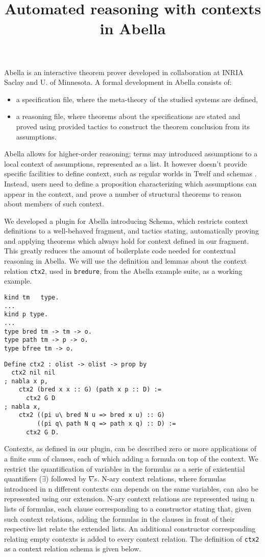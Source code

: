 \documentclass[nocopyrightspace,authoryear]{sigplanconf}
\title{Automated reasoning with contexts in Abella}
\begin{document}
\maketitle
Abella \cite{abellasys} is an interactive theorem prover developed in collaboration at INRIA Saclay and U. of Minnesota. A formal development in Abella consists of:
\begin{itemize}
\item a specification file, where the meta-theory of the studied systems are defined,
\item a reasoning file, where theorems about the specifications are stated and proved using provided tactics to construct the theorem conclusion from its assumptions.
\end{itemize}

Abella allows for higher-order reasoning; terms may introduced assumptions to a local context of assumptions, represented as a list. It however doesn't provide specific facilities to define context, such as regular worlds in Twelf \cite{twelfsys} and schemas \cite{belugasys}. Instead, users need to define a proposition characterizing which assumptions can appear in the context, and prove a number of structural theorems to reason about members of such context.


We developed a plugin for Abella introducing Schema, which restricts context definitions to a well-behaved fragment, and tactics stating, automatically proving and applying theorems which always hold for context defined in our fragment. This greatly reduces the amount of boilerplate code needed for contextual reasoning in Abella. We will use the definition and lemmas about the context relation \lstinline|ctx2|, used in \lstinline|bredure|, from the Abella example suite,  as a working example.
\begin{lstlisting}
kind tm   type.
...
kind p type.
...
type bred tm -> tm -> o.
type path tm -> p -> o.
type bfree tm -> o.
\end{lstlisting}
\begin{lstlisting}
Define ctx2 : olist -> olist -> prop by
  ctx2 nil nil
; nabla x p,
    ctx2 (bred x x :: G) (path x p :: D) := 
      ctx2 G D
; nabla x,
    ctx2 ((pi u\ bred N u => bred x u) :: G)
         ((pi q\ path N q => path x q) :: D) :=
      ctx2 G D.
\end{lstlisting}

Contexts, as defined in our plugin, can be described zero or more applications of a finite sum of clauses, each of which adding a formula on top of the context. We restrict the quantification of variables in the formulas as a serie of existential quantifiers ($\exists$) followed by $\nabla$s. N-ary context relations, where formulas introduced in  n different contexts can depends on the same variables, can also be represented using our extension. N-ary context relations are represented using n lists of formulas, each clause corresponding to a constructor stating that, given such context relations, adding the formulas in the clauses in front of their respective list relate the extended lists. An additional constructor corresponding relating empty contexts is added to every context relation. The definition of \lstinline|ctx2| as a context relation schema is given below.
\end{document}
